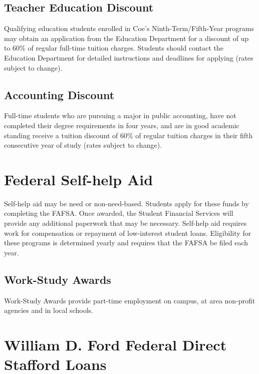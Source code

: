 \documentclass[
  letterpaper,
]{scrbook}
\begin{document}
\subsection{\texorpdfstring{\textbf{Teacher Education
Discount}}{Teacher Education Discount}}\label{teacher-education-discount}

Qualifying education students enrolled in Coe's Ninth-Term/Fifth-Year
programs may obtain an application from the Education Department for a
discount of up to 60\% of regular full-time tuition charges. Students
should contact the Education Department for detailed instructions and
deadlines for applying (rates subject to change).

\subsection{\texorpdfstring{\textbf{Accounting
Discount}}{Accounting Discount}}\label{accounting-discount}

Full-time students who are pursuing a major in public accounting, have
not completed their degree requirements in four years, and are in good
academic standing receive a tuition discount of 60\% of regular tuition
charges in their fifth consecutive year of study (rates subject to
change).

\section{Federal Self-help Aid}\label{federal-self-help-aid}

Self-help aid may be need or non-need-based. Students apply for these
funds by completing the FAFSA. Once awarded, the Student Financial
Services will provide any additional paperwork that may be necessary.
Self-help aid requires work for compensation or repayment of
low-interest student loans. Eligibility for these programs is determined
yearly and requires that the FAFSA be filed each year.

\subsection{\texorpdfstring{\textbf{Work-Study
Awards}}{Work-Study Awards}}\label{work-study-awards}

Work-Study Awards provide part-time employment on campus, at area
non-profit agencies and in local schools.

\section{\texorpdfstring{\textbf{William D. Ford Federal Direct Stafford
Loans}}{William D. Ford Federal Direct Stafford Loans}}\label{william-d.-ford-federal-direct-stafford-loans}
\end{document}
